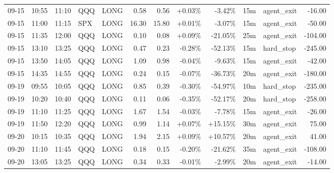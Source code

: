 \documentclass[11pt,a4paper]{article}
\begin{document}
\begin{center}
\begin{longtable}{>{\color{txtmain}}l l l l l r r r r r >{\color{txtmain}}l r}
09-15 & 10:55 & 11:10 & QQQ & LONG & 0.58 & 0.56 & \textcolor{wingreen}{+0.03\%} & \textcolor{lossred}{-3.42\%} & 15m & agent\_exit & \textcolor{lossred}{-16.00} \\
09-15 & 11:00 & 11:15 & SPX & LONG & 16.30 & 15.80 & \textcolor{wingreen}{+0.01\%} & \textcolor{lossred}{-3.07\%} & 15m & agent\_exit & \textcolor{lossred}{-50.00} \\
09-15 & 11:35 & 12:00 & QQQ & LONG & 0.10 & 0.08 & \textcolor{wingreen}{+0.09\%} & \textcolor{lossred}{-21.05\%} & 25m & agent\_exit & \textcolor{lossred}{-104.00} \\
09-15 & 13:10 & 13:25 & QQQ & LONG & 0.47 & 0.23 & \textcolor{lossred}{-0.28\%} & \textcolor{lossred}{-52.13\%} & 15m & hard\_stop & \textcolor{lossred}{-245.00} \\
09-15 & 13:50 & 14:05 & QQQ & LONG & 1.09 & 0.98 & \textcolor{lossred}{-0.04\%} & \textcolor{lossred}{-9.63\%} & 15m & agent\_exit & \textcolor{lossred}{-42.00} \\
09-15 & 14:35 & 14:55 & QQQ & LONG & 0.24 & 0.15 & \textcolor{lossred}{-0.07\%} & \textcolor{lossred}{-36.73\%} & 20m & agent\_exit & \textcolor{lossred}{-180.00} \\
09-19 & 09:55 & 10:05 & QQQ & LONG & 0.85 & 0.39 & \textcolor{lossred}{-0.30\%} & \textcolor{lossred}{-54.97\%} & 10m & hard\_stop & \textcolor{lossred}{-235.00} \\
09-19 & 10:20 & 10:40 & QQQ & LONG & 0.11 & 0.06 & \textcolor{lossred}{-0.35\%} & \textcolor{lossred}{-52.17\%} & 20m & hard\_stop & \textcolor{lossred}{-258.00} \\
09-19 & 11:10 & 11:25 & QQQ & LONG & 1.67 & 1.54 & \textcolor{lossred}{-0.03\%} & \textcolor{lossred}{-7.78\%} & 15m & agent\_exit & \textcolor{lossred}{-26.00} \\
09-19 & 11:50 & 12:20 & QQQ & LONG & 0.99 & 1.14 & \textcolor{wingreen}{+0.07\%} & \textcolor{wingreen}{+15.15\%} & 30m & agent\_exit & \textcolor{wingreen}{75.00} \\
09-20 & 10:15 & 10:35 & QQQ & LONG & 1.94 & 2.15 & \textcolor{wingreen}{+0.09\%} & \textcolor{wingreen}{+10.57\%} & 20m & agent\_exit & \textcolor{wingreen}{41.00} \\
09-20 & 11:10 & 11:45 & QQQ & LONG & 0.18 & 0.15 & \textcolor{lossred}{-0.20\%} & \textcolor{lossred}{-21.62\%} & 35m & agent\_exit & \textcolor{lossred}{-108.00} \\
09-20 & 13:05 & 13:25 & QQQ & LONG & 0.34 & 0.33 & \textcolor{lossred}{-0.01\%} & \textcolor{lossred}{-2.99\%} & 20m & agent\_exit & \textcolor{lossred}{-14.00} \\

\end{longtable}
\end{center}
\end{document}
